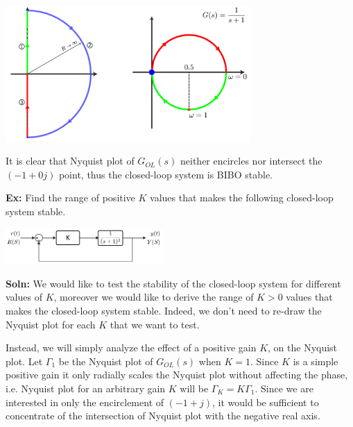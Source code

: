 \documentclass{article}
\begin{document}
  \begin{minipage}[h]{1\linewidth}
    \begin{center}
      \includegraphics[width=0.7\textwidth]{figs/ex2}
    \end{center}
  \end{minipage}

\vspace{3 pt}

It is clear that Nyquist plot of $G_{OL}(s)$ neither encircles nor
intersect the $(-1 + 0 j)$ point, thus the closed-loop system is 
BIBO stable. 

\vspace{6 pt}

\textbf{Ex:} Find the range of positive $K$ values that makes the following
closed-loop system stable.

\vspace{6 pt}

  \begin{minipage}[h]{1\linewidth}
    \begin{center}
      \includegraphics[width=0.45\textwidth]{figs/ex2block}
    \end{center}
  \end{minipage}

\vspace{6 pt}

\textbf{Soln:} We would like to test the stability of the closed-loop system
for different values of $K$, moreover we would like to derive 
the range of $K > 0$ values that makes the closed-loop system 
stable. Indeed, we don't need to re-draw the Nyquist plot
for each $K$ that we want to test. 

Instead, we will simply analyze the
effect of a positive gain $K$, on the Nyquist plot. Let 
$\Gamma_1$ be the Nyquist plot of $G_{OL}(s)$ when $K = 1$. Since $K$
is a simple positive gain it only radially scales the Nyquist plot
without affecting the phase, i.e. Nyquist plot for an arbitrary gain
$K$ will be $\Gamma_K = K \Gamma_1$. Since we are interested in only
the encirclement  of $(-1 + j)$, it would be sufficient to concentrate of the 
intersection of Nyquist plot with the negative real axis. 
\end{document}
